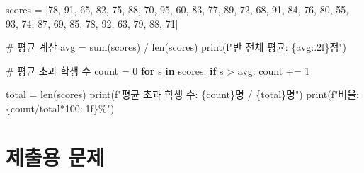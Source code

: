 \documentclass[
  korean,
  11pt,
  a4paper,
  DIV=11,
  numbers=noendperiod]{scrreprt}
\newenvironment{Shaded}{\begin{snugshade}}{\end{snugshade}}
\newcommand{\BuiltInTok}[1]{\textcolor[rgb]{0.00,0.23,0.31}{#1}}
\newcommand{\CommentTok}[1]{\textcolor[rgb]{0.37,0.37,0.37}{#1}}
\newcommand{\ControlFlowTok}[1]{\textcolor[rgb]{0.00,0.23,0.31}{\textbf{#1}}}
\newcommand{\DecValTok}[1]{\textcolor[rgb]{0.68,0.00,0.00}{#1}}
\newcommand{\KeywordTok}[1]{\textcolor[rgb]{0.00,0.23,0.31}{\textbf{#1}}}
\newcommand{\NormalTok}[1]{\textcolor[rgb]{0.00,0.23,0.31}{#1}}
\newcommand{\OperatorTok}[1]{\textcolor[rgb]{0.37,0.37,0.37}{#1}}
\newcommand{\SpecialCharTok}[1]{\textcolor[rgb]{0.37,0.37,0.37}{#1}}
\newcommand{\SpecialStringTok}[1]{\textcolor[rgb]{0.13,0.47,0.30}{#1}}
\begin{document}
\begin{Shaded}
\begin{Highlighting}[]
\NormalTok{scores }\OperatorTok{=}\NormalTok{ [}\DecValTok{78}\NormalTok{, }\DecValTok{91}\NormalTok{, }\DecValTok{65}\NormalTok{, }\DecValTok{82}\NormalTok{, }\DecValTok{75}\NormalTok{, }\DecValTok{88}\NormalTok{, }\DecValTok{70}\NormalTok{, }\DecValTok{95}\NormalTok{, }\DecValTok{60}\NormalTok{, }\DecValTok{83}\NormalTok{,}
          \DecValTok{77}\NormalTok{, }\DecValTok{89}\NormalTok{, }\DecValTok{72}\NormalTok{, }\DecValTok{68}\NormalTok{, }\DecValTok{91}\NormalTok{, }\DecValTok{84}\NormalTok{, }\DecValTok{76}\NormalTok{, }\DecValTok{80}\NormalTok{, }\DecValTok{55}\NormalTok{, }\DecValTok{93}\NormalTok{,}
          \DecValTok{74}\NormalTok{, }\DecValTok{87}\NormalTok{, }\DecValTok{69}\NormalTok{, }\DecValTok{85}\NormalTok{, }\DecValTok{78}\NormalTok{, }\DecValTok{92}\NormalTok{, }\DecValTok{63}\NormalTok{, }\DecValTok{79}\NormalTok{, }\DecValTok{88}\NormalTok{, }\DecValTok{71}\NormalTok{]}

\CommentTok{\# 평균 계산}
\NormalTok{avg }\OperatorTok{=} \BuiltInTok{sum}\NormalTok{(scores) }\OperatorTok{/} \BuiltInTok{len}\NormalTok{(scores)}
\BuiltInTok{print}\NormalTok{(}\SpecialStringTok{f"반 전체 평균: }\SpecialCharTok{\{}\NormalTok{avg}\SpecialCharTok{:.2f\}}\SpecialStringTok{점"}\NormalTok{)}

\CommentTok{\# 평균 초과 학생 수}
\NormalTok{count }\OperatorTok{=} \DecValTok{0}
\ControlFlowTok{for}\NormalTok{ s }\KeywordTok{in}\NormalTok{ scores:}
    \ControlFlowTok{if}\NormalTok{ s }\OperatorTok{\textgreater{}}\NormalTok{ avg:}
\NormalTok{        count }\OperatorTok{+=} \DecValTok{1}

\NormalTok{total }\OperatorTok{=} \BuiltInTok{len}\NormalTok{(scores)}
\BuiltInTok{print}\NormalTok{(}\SpecialStringTok{f"평균 초과 학생 수: }\SpecialCharTok{\{}\NormalTok{count}\SpecialCharTok{\}}\SpecialStringTok{명 / }\SpecialCharTok{\{}\NormalTok{total}\SpecialCharTok{\}}\SpecialStringTok{명"}\NormalTok{)}
\BuiltInTok{print}\NormalTok{(}\SpecialStringTok{f"비율: }\SpecialCharTok{\{}\NormalTok{count}\OperatorTok{/}\NormalTok{total}\OperatorTok{*}\DecValTok{100}\SpecialCharTok{:.1f\}}\SpecialStringTok{\%"}\NormalTok{)}
\end{Highlighting}
\end{Shaded}

\section{제출용 문제}\label{uxc81cuxcd9cuxc6a9-uxbb38uxc81c}
\end{document}
